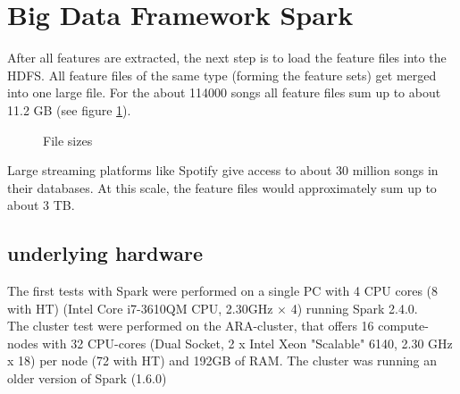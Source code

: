 
\section{Big Data Framework Spark}\label{bds1}

After all features are extracted, the next step is to load the feature files into the HDFS.
All feature files of the same type (forming the feature sets) get merged into one large file. For the about 114000 songs all feature files sum up to about 11.2 GB (see figure \ref{filesize}). 

\begin{figure}[htbp]
	\centering
	\caption{File sizes}
	\label{filesize}
\end{figure}

\noindent Large streaming platforms like Spotify give access to about 30 million songs in their databases. At this scale, the feature files would approximately sum up to about 3 TB.\\

\subsection{underlying hardware}

The first tests with Spark were performed on a single PC with 4 CPU cores (8 with HT) (Intel Core i7-3610QM CPU, 2.30GHz × 4) running Spark 2.4.0.\\ The cluster test were performed on the ARA-cluster, that offers 16 compute-nodes with 32 CPU-cores (Dual Socket, 2 x Intel Xeon "Scalable" 6140, 2.30 GHz x 18) per node (72 with HT) and 192GB of RAM. The cluster was running an older version of Spark (1.6.0)\\

